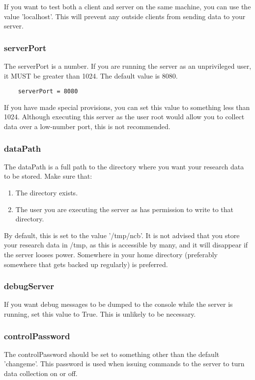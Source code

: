 \documentclass[12pt]{article}
\begin{document}
If you want to test both a client and server on the same machine, you can use the value {\code 'localhost'}. This will prevent any outside clients from sending data to your server.

\subsubsection{{\code serverPort}}
The {\code serverPort} is a number. If you are running the server as an unprivileged user, it {\code MUST} be greater than 1024. The default value is 8080.

\begin{verbatim}
	serverPort = 8080
\end{verbatim}

If you have made special provisions, you can set this value to something less than 1024. Although executing this server as the user root would allow you to collect data over a low-number port, this is not recommended.

\subsubsection{{\code dataPath}}
The {\code dataPath} is a full path to the directory where you want your research data to be stored. Make sure that:

\begin{enumerate}
	\item The directory exists.
	\item The user you are executing the server as has permission to write to that directory.
\end{enumerate}

By default, this is set to the value {\code '/tmp/ncb'}. It is not advised that you store your research data in {\code /tmp}, as this is accessible by many, and it will disappear if the server looses power. Somewhere in your home directory (preferably somewhere that gets backed up regularly) is preferred.

\subsubsection{{\code debugServer}}
If you want debug messages to be dumped to the console while the server is running, set this value to {\code True}. This is unlikely to be necessary.

\subsubsection{{\code controlPassword}}
The {\code controlPassword} should be set to something other than the default {\code 'changeme'}. This password is used when issuing commands to the server to turn data collection on or off.
\end{document}
